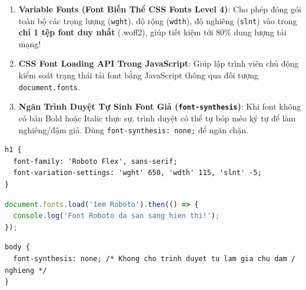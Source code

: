 \documentclass[11pt,oneside]{book}
\newcommand{\codeinline}[1]{\textcolor{accentOrange}{\texttt{#1}}}
\begin{document}
\begin{conceptBox}
\begin{enumerate}[leftmargin=1.5em, itemsep=4pt, parsep=0pt]
    \item \textbf{Variable Fonts (Font Biến Thể CSS Fonts Level 4)}: Cho phép đóng gói toàn bộ các trọng lượng (\codeinline{wght}), độ rộng (\codeinline{wdth}), độ nghiêng (\codeinline{slnt}) vào trong \textbf{chỉ 1 tệp font duy nhất} (.woff2), giúp tiết kiệm tới 80\% dung lượng tải mạng!
    \item \textbf{CSS Font Loading API Trong JavaScript}: Giúp lập trình viên chủ động kiểm soát trạng thái tải font bằng JavaScript thông qua đối tượng \codeinline{document.fonts}.
    \item \textbf{Ngăn Trình Duyệt Tự Sinh Font Giả (\codeinline{font-synthesis})}: Khi font không có bản Bold hoặc Italic thực sự, trình duyệt có thể tự bóp méo ký tự để làm nghiêng/đậm giả. Dùng \codeinline{font-synthesis: none;} để ngăn chặn.
\end{enumerate}
\end{conceptBox}

\begin{codeWindow}
\begin{lstlisting}[language=CSS3]
h1 {
  font-family: 'Roboto Flex', sans-serif;
  font-variation-settings: 'wght' 650, 'wdth' 115, 'slnt' -5;
}
\end{lstlisting}
\end{codeWindow}

\begin{codeWindow}
\begin{lstlisting}[language=JavaScript]
document.fonts.load('1em Roboto').then(() => {
  console.log('Font Roboto da san sang hien thi!');
});
\end{lstlisting}
\end{codeWindow}

\begin{codeWindow}
\begin{lstlisting}[language=CSS3]
body {
  font-synthesis: none; /* Khong cho trinh duyet tu lam gia chu dam / nghieng */
}
\end{lstlisting}
\end{codeWindow}
\end{document}
